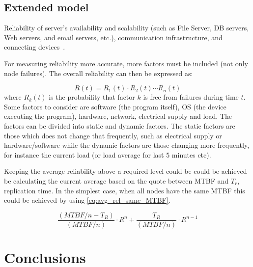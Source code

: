 \documentclass{cslthse-msc}
\begin{document}
\section{Extended model} \label{subsec:future_extended_model}
Reliability of server’s availability and scalability (such as File Server, DB servers, Web servers, and email servers, etc.), communication infrastructure, and connecting devices~\cite{surveyReliabilityDistr}.

For measuring reliability more accurate, more factors must be included (not only node failures). The overall reliability can then be expressed as:

\begin{equation} \label{eq:overall_reliability}
R(t) = R_{1}(t) \cdot R_{2}(t) \cdots R_{n}(t)
\end{equation}
where $R_{k}(t)$ is the probability that factor $k$ is free from failures during time $t$. Some factors to consider are software (the program itself), OS (the device executing the program), hardware, network, electrical supply and load. The factors can be divided into static and dynamic factors. The static factors are those which does not change that frequently, such as electrical supply or hardware/software while the dynamic factors are those changing more frequently, for instance the current load (or load average for last 5 minutes etc). 

Keeping the average reliability above a required level could be could be achieved be calculating the current average based on the quote between MTBF and \emph{$T_r$}, replication time.
In the simplest case, when all nodes have the same MTBF this could be achieved by using \cref{eq:avg_rel_same_MTBF}.

\begin{equation} \label{eq:avg_rel_same_MTBF}
	\frac{(MTBF/n - T_{R})}{(MTBF/n)} \cdot R^n + \frac{T_{R}}{(MTBF/n)} \cdot R^{n-1}
\end{equation}

\chapter{Conclusions} \label{ch:conclusions}
\end{document}
